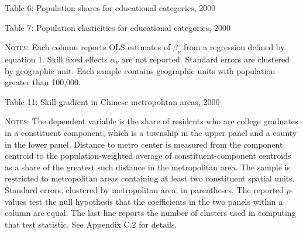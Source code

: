 \documentclass[11pt]{article}
\begin{document}
\begin{table} \caption*{Table 6: Population shares for educational categories, 2000} \begin{center}

\end{center}\end{table}


\begin{table}
\caption*{Table 7: Population elasticities for educational categories, 2000\label{tab:China-edu-population-elasticities}}
\begin{center}

\begin{minipage}[t]{0.85\textwidth}%
{\footnotesize \textsc{Notes}:
Each column reports OLS estimates of $\beta_{\nu}$ from a regression defined by  equation 1.
Skill fixed effects $\alpha_{\nu}$ are not reported.
Standard errors are clustered by geographic unit.
Each sample contains geographic units with population greater than 100,000.\par}
\end{minipage}
\end{center}
\end{table}


\begin{table}[ph]
\caption*{Table 11: Skill gradient in Chinese metropolitan areas, 2000}
\label{tab:skillgradient}
\begin{center}

\begin{minipage}{0.96\textwidth}
{\footnotesize \textsc{Notes}:
	The dependent variable is the share of residents who are college graduates in a constituent component,
	which is a township in the upper panel and a county in the lower panel.
	Distance to metro center is measured from the component centroid to the population-weighted average of constituent-component centroids
  	as a share of the greatest such distance in the metropolitan area.
  	The sample is restricted to metropolitan areas containing at least two constituent spatial units.
	Standard errors, clustered by metropolitan area, in parentheses.
	The reported $p$-values test the null hypothesis that the coefficients in the two panels within a column are equal.
	The last line reports the number of clusters used in computing that test statistic.
	See Appendix C.2 for details.\par
}
\end{minipage}
\end{center}
\end{table}
\end{document}
